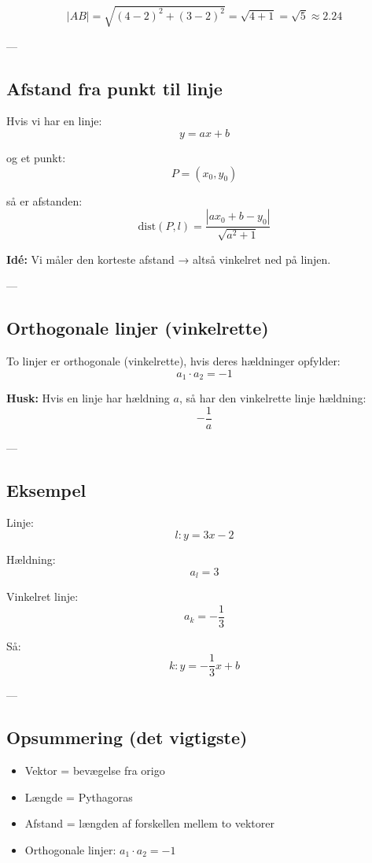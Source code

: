 \[
|AB| = \sqrt{(4-2)^2 + (3-2)^2}
= \sqrt{4 + 1}
= \sqrt{5} \approx 2.24
\]

---

\subsection{Afstand fra punkt til linje}
Hvis vi har en linje:
\[
y = ax + b
\]

og et punkt:
\[
P = (x_0, y_0)
\]

så er afstanden:
\[
\text{dist}(P,l) = \frac{|ax_0 + b - y_0|}{\sqrt{a^2 + 1}}
\]

\textbf{Idé:}
Vi måler den korteste afstand → altså vinkelret ned på linjen.

---

\subsection{Orthogonale linjer (vinkelrette)}
To linjer er orthogonale (vinkelrette), hvis deres hældninger opfylder:
\[
a_1 \cdot a_2 = -1
\]

\textbf{Husk:}
Hvis en linje har hældning $a$, så har den vinkelrette linje hældning:
\[
-\frac{1}{a}
\]

---

\subsection{Eksempel}
Linje:
\[
l: y = 3x - 2
\]

Hældning:
\[
a_l = 3
\]

Vinkelret linje:
\[
a_k = -\frac{1}{3}
\]

Så:
\[
k: y = -\frac{1}{3}x + b
\]

---

\subsection{Opsummering (det vigtigste)}
\begin{itemize}
    \item Vektor = bevægelse fra origo
    \item Længde = Pythagoras
    \item Afstand = længden af forskellen mellem to vektorer
    \item Orthogonale linjer: $a_1 \cdot a_2 = -1$
\end{itemize}